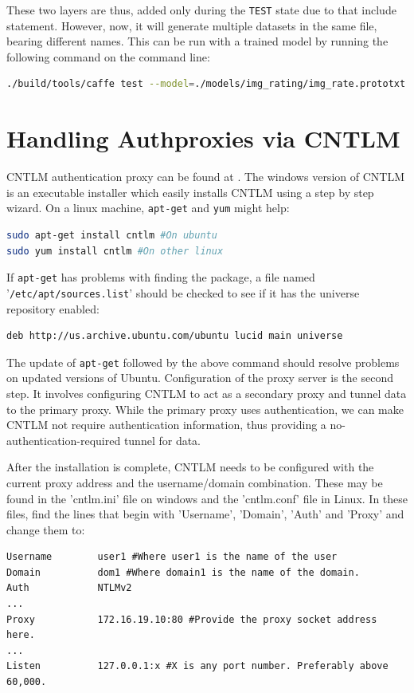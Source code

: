 \documentclass{article}
\begin{document}
These two layers are thus, added only during the \verb|TEST| state due to that include statement. However, now, it will generate multiple datasets in the same file, bearing different names. This can be run with a trained model by running the following command on the command line:

\begin{lstlisting}[tabsize=4,language=bash,breaklines]
./build/tools/caffe test --model=./models/img_rating/img_rate.prototxt --weights=./models/img_rating/trained_iter_1000.caffemodel --gpu=0
\end{lstlisting}

\section{Handling Authproxies via CNTLM}
CNTLM authentication proxy can be found at \cite{cntlm}. The windows version of CNTLM is an executable installer which easily installs CNTLM using a step by step wizard. On a linux machine, \texttt{apt-get} and \texttt{yum} might help:
\begin{lstlisting}[tabsize=4,language=bash]
sudo apt-get install cntlm #On ubuntu
sudo yum install cntlm #On other linux
\end{lstlisting}

If \texttt{apt-get} has problems with finding the package, a file named '\texttt{/etc/apt/sources.list}' should be checked to see if it has the universe repository enabled:
\begin{verbatim}
deb http://us.archive.ubuntu.com/ubuntu lucid main universe
\end{verbatim}

The update of \texttt{apt-get} followed by the above command should resolve problems on updated versions of Ubuntu. Configuration of the proxy server is the second step. It involves configuring CNTLM to act as a secondary proxy and tunnel data to the primary proxy. While the primary proxy uses authentication, we can make CNTLM not require authentication information, thus providing a no-authentication-required tunnel for data.
\par
After the installation is complete, CNTLM needs to be configured with the current proxy address and the username/domain combination. These may be found in the 'cntlm.ini' file on windows and the 'cntlm.conf' file in Linux. In these files, find the lines that begin with 'Username', 'Domain', 'Auth' and 'Proxy' and change them to:
\begin{verbatim}
Username		user1 #Where user1 is the name of the user
Domain			dom1 #Where domain1 is the name of the domain.
Auth			NTLMv2
...
Proxy			172.16.19.10:80 #Provide the proxy socket address here.
...
Listen			127.0.0.1:x #X is any port number. Preferably above 60,000.
\end{verbatim}
\end{document}
